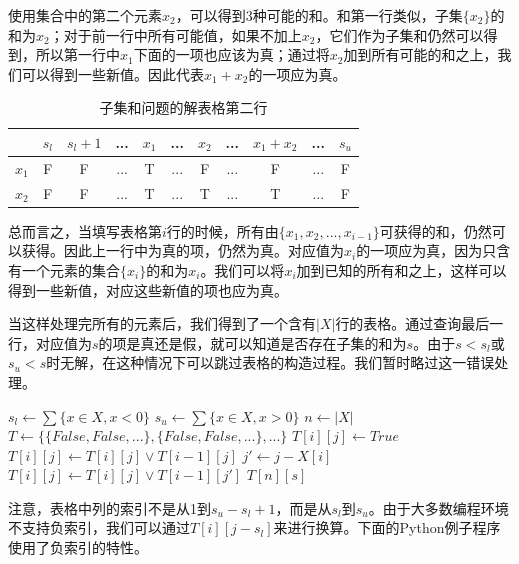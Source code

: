 \documentclass[b5paper]{ctexart}
\begin{document}
使用集合中的第二个元素$x_2$，可以得到3种可能的和。和第一行类似，子集$\{x_2\}$的和为$x_2$；对于前一行中所有可能值，如果不加上$x_2$，它们作为子集和仍然可以得到，所以第一行中$x_1$下面的一项也应该为真；通过将$x_2$加到所有可能的和之上，我们可以得到一些新值。因此代表$x_1 + x_2$的一项应为真。

\begin{table}[htbp]
\centering
\begin{tabular}{|c|c|c|c|c|c|c|c|c|c|c|}
\hline
 & $s_l$ & $s_l+1$ & ... & $x_1$ & ... & $x_2$ & ... & $x_1 + x_2$ & ... & $s_u$ \\
\hline
$x_1$ & F & F & ... & T & ... & F & ... & F & ... & F \\
\hline
$x_2$ & F & F & ... & T & ... & T & ... & T & ... & F \\
\hline
\end{tabular}
\caption{子集和问题的解表格第二行}
\end{table}

总而言之，当填写表格第$i$行的时候，所有由$\{x_1, x_2, ..., x_{i-1}\}$可获得的和，仍然可以获得。因此上一行中为真的项，仍然为真。对应值为$x_i$的一项应为真，因为只含有一个元素的集合$\{x_i\}$的和为$x_i$。我们可以将$x_i$加到已知的所有和之上，这样可以得到一些新值，对应这些新值的项也应为真。

当这样处理完所有的元素后，我们得到了一个含有$|X|$行的表格。通过查询最后一行，对应值为$s$的项是真还是假，就可以知道是否存在子集的和为$s$。由于$s < s_l$或$s_u < s$时无解，在这种情况下可以跳过表格的构造过程。我们暂时略过这一错误处理。

\begin{algorithmic}[1]
  \State $s_l \gets \sum \{x \in X, x < 0\}$
  \State $s_u \gets \sum \{x \in X, x > 0\}$
  \State $n \gets |X|$
  \State $T \gets \{\{False, False, ...\}, \{False, False, ...\}, ...\}$ 
        \State $T[i][j] \gets True$
      \EndIf
        \State $T[i][j] \gets T[i][j] \lor T[i-1][j]$
        \State $j' \gets j - X[i]$
          \State $T[i][j] \gets T[i][j] \lor T[i-1][j']$
        \EndIf
      \EndIf
    \EndFor
  \EndFor
  \State \Return $T[n][s]$
\EndFunction
\end{algorithmic}

注意，表格中列的索引不是从1到$s_u-s_l + 1$，而是从$s_l$到$s_u$。由于大多数编程环境不支持负索引，我们可以通过$T[i][j-s_l]$来进行换算。下面的Python例子程序使用了负索引的特性。
\end{document}
